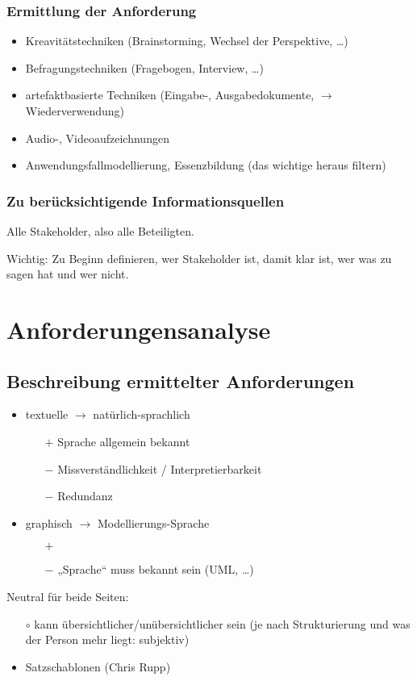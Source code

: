 \documentclass{scrreprt}
\begin{document}
\subsection{Ermittlung der Anforderung}

\begin{itemize}
\item Kreavitätstechniken (Brainstorming, Wechsel der Perspektive, …)
\item Befragungstechniken (Fragebogen, Interview, …)
\item artefaktbasierte Techniken (Eingabe-, Ausgabedokumente, $\to$ Wiederverwendung)
\item Audio-, Videoaufzeichnungen
\item Anwendungsfallmodellierung, Essenzbildung (das wichtige heraus filtern)
\end{itemize}

\subsection{Zu berücksichtigende Informationsquellen}

Alle Stakeholder, also alle Beteiligten. 

Wichtig: Zu Beginn definieren, wer Stakeholder ist, damit klar ist, wer was zu sagen hat und wer nicht.

\chapter{Anforderungensanalyse}

\section*{Beschreibung ermittelter Anforderungen}
\begin{itemize}
\item textuelle $\to$ natürlich-sprachlich
\begin{itemize}
\item[$+$] Sprache allgemein bekannt
\item[$-$] Missverständlichkeit / Interpretierbarkeit
\item[$-$] Redundanz
\end{itemize}
\item graphisch $\to$ Modellierungs-Sprache
\begin{itemize}
\item[$+$] 
\item[$-$] „Sprache“ muss bekannt sein (UML, …)
\end{itemize}
\end{itemize}
Neutral für beide Seiten:
\begin{itemize}
\item[$\circ$] kann übersichtlicher/unübersichtlicher sein (je nach Strukturierung und was der Person mehr liegt: subjektiv)
\end{itemize}
\begin{itemize}
\item Satzschablonen (Chris Rupp)
\end{itemize}
\end{document}
